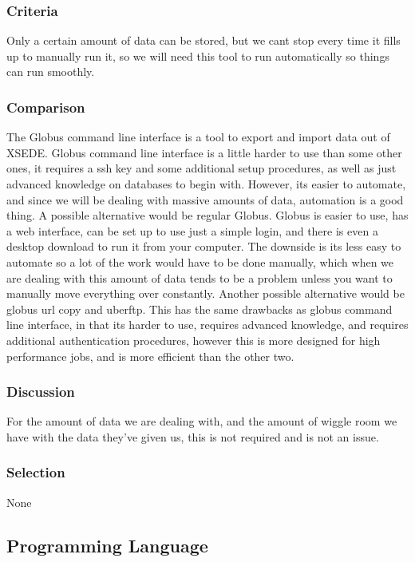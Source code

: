 \documentclass[10pt,draftclsnofoot,onecolumn,journal,compsoc]{IEEEtran}
\begin{document}
\subsubsection{Criteria}
\noindent Only a certain amount
of data can be stored, but we cant stop every time it fills up to manually run it, so we will need this tool to run
automatically so things can run smoothly.

\subsubsection{Comparison}
The Globus command line interface is a tool to export and import data out of XSEDE. Globus command line
interface is a little harder to use than some other ones, it requires a ssh key and some additional setup procedures,
as well as just advanced knowledge on databases to begin with. However, its easier to automate, and since we
will be dealing with massive amounts of data, automation is a good thing. \cite{4}
A possible alternative would be regular Globus. Globus is easier to use, has a web interface, can be set up to
use just a simple login, and there is even a desktop download to run it from your computer. The downside is its
less easy to automate so a lot of the work would have to be done manually, which when we are dealing with
this amount of data tends to be a problem unless you want to manually move everything over constantly.
Another possible alternative would be globus url copy and uberftp. This has the same drawbacks as globus
command line interface, in that its harder to use, requires advanced knowledge, and requires additional authentication
procedures, however this is more designed for high performance jobs, and is more efficient than the other
two.

\subsubsection{Discussion}
\noindent For the amount of data we are dealing with, and the amount of wiggle room we have with the data they've
given us, this is not required and is not an issue.

\subsubsection{Selection}
None

\subsection{Programming Language}
\end{document}
